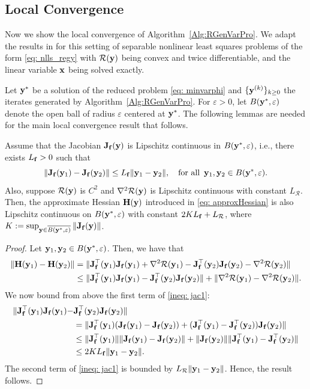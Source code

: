 \documentclass[onefignum,onetabnum]{siamart171218}
\newcommand{\bH}{{\bf H}}
\newcommand{\bJ}{{\bf J}}
\newcommand{\bff}{{\bf f}}
\newcommand{\bx}{{\bf x}}
\newcommand{\by}{{\bf y}}
\newcommand{\calR}{\mathcal{R}}
\begin{document}
\subsection{Local Convergence} Now we show the local convergence of Algorithm~\ref{Alg:RGenVarPro}. We adapt the results in \cite{espanol2025local} for this setting of separable nonlinear least squares problems of the form \eqref{eq: nlls_regy} with $\calR(\by)$ being convex and twice differentiable, and the linear variable $\bx$ being solved exactly.

Let $\by^*$ be a solution of the reduced problem \eqref{eq: minvarphi} and $\{\by^{(k)}\}_{k \geq 0}$ the iterates generated by Algorithm~\ref{Alg:RGenVarPro}. For $\varepsilon>0$, let $B(\by^*, \varepsilon)$ denote the open ball of radius $\varepsilon$ centered at $\by^*$. The following lemmas are needed for the main local convergence result that follows.
\begin{lemma}
Assume that the Jacobian $\bJ_{\bf f}(\by)$ is Lipschitz continuous in $B(\by^*, \varepsilon)$, i.e., there exists $L_\bff > 0$ such that
\begin{equation*}
\|\bJ_{\bf f}(\by_1) - \bJ_{\bf f}(\by_2)\| \leq L_\bff \|\by_1 - \by_2\|, \quad \mbox{for all } \,\by_1, \by_2 \in B(\by^*, \varepsilon). 
\end{equation*}
Also, suppose $\calR(\by)$ is $C^2$ and $\nabla^2 \calR(\by)$ is Lipschitz continuous with constant $L_\calR$. Then, the approximate Hessian $\bH(\by)$ introduced in \eqref{eq: approxHessian} is also Lipschitz continuous on $B(\by^*, \varepsilon)$ with constant $2 K L_\bff + L_\calR$, where $K := \sup_{\by \in \overline{B(\by^*, \varepsilon)}} \|\bJ_{\bf f}(\by)\|$.
\end{lemma}

\begin{proof} Let $\by_1, \by_2 \in B(\by^*, \varepsilon)$. Then, we have that
\begin{align}\label{ineq: jac1}
\|\bH(\by_1) - \bH(\by_2)\|&=\|\bJ^\top_{\bf f}(\by_1) \bJ_{\bf f}(\by_1) + \nabla^2 \calR(\by_1) - \bJ^\top_{\bf f}(\by_2) \bJ_{\bf f}(\by_2) - \nabla^2 \calR(\by_2)\| \nonumber \\
&\leq \|\bJ^\top_{\bf f}(\by_1) \bJ_{\bf f}(\by_1) - \bJ^\top_{\bf f}(\by_2) \bJ_{\bf f}(\by_2)\| + \|\nabla^2 \calR(\by_1) - \nabla^2 \calR(\by_2)\|.
\end{align}
We now bound from above the first term of \eqref{ineq: jac1}:
\begin{align*} 
\|\bJ^\top_{\bf f}(\by_1) \bJ_{\bf f}(\by_1) - &\bJ^\top_{\bf f}(\by_2) \bJ_{\bf f}(\by_2)\|\\
&= \|\bJ^\top_{\bf f}(\by_1)(\bJ_{\bf f}(\by_1) - \bJ_{\bf f}(\by_2)) + (\bJ^\top_{\bf f}(\by_1) - \bJ^\top_{\bf f}(\by_2)) \bJ_{\bf f}(\by_2)\| \\
&\leq \|\bJ^\top_{\bf f}(\by_1)\| \|\bJ_{\bf f}(\by_1) - \bJ_{\bf f}(\by_2)\| + \|\bJ_{\bf f}(\by_2)\| \|\bJ^\top_{\bf f}(\by_1) - \bJ^\top_{\bf f}(\by_2)\| \\
&\leq 2 K L_\bff \|\by_1 - \by_2\|.
\end{align*}
The second term of \eqref{ineq: jac1} is bounded by $L_\calR \|\by_1 - \by_2\|$. Hence, the result follows.
\end{proof}
\end{document}
